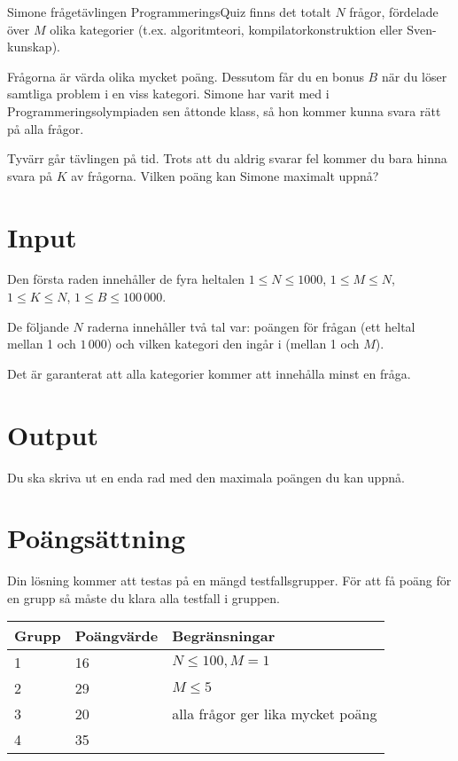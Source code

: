 Simone frågetävlingen ProgrammeringsQuiz finns det totalt $N$ frågor, fördelade över $M$ olika kategorier (t.ex. algoritmteori,
kompilatorkonstruktion eller Sven-kunskap).

Frågorna är värda olika mycket poäng. Dessutom får du en bonus $B$ när du löser samtliga problem i en viss kategori.
Simone har varit med i Programmeringsolympiaden sen åttonde klass, så hon kommer kunna svara rätt på alla frågor.

Tyvärr går tävlingen på tid. Trots att du aldrig svarar fel kommer du bara hinna svara på $K$ av frågorna.
Vilken poäng kan Simone maximalt uppnå?

\section*{Input}
Den första raden innehåller de fyra heltalen $1 \le N \le 1000$, $1 \le M \le N$, $1 \le K \le N$, $1 \le B \le 100\,000$.

De följande $N$ raderna innehåller två tal var: poängen för frågan (ett heltal mellan 1 och $1\,000$) och vilken kategori den ingår i (mellan 1 och $M$).

Det är garanterat att alla kategorier kommer att innehålla minst en fråga.

\section*{Output}
Du ska skriva ut en enda rad med den maximala poängen du kan uppnå.

\section*{Poängsättning}
Din lösning kommer att testas på en mängd testfallsgrupper. För att få poäng för en grupp så måste du klara alla testfall i gruppen.

\begin{tabular}{| l | l | l |}
  \hline
  Grupp & Poängvärde & Begränsningar\\ \hline
  1     & 16         & $N \le 100, M = 1$ \\ \hline
  2     & 29         & $M \le 5$ \\ \hline
  3     & 20         & alla frågor ger lika mycket poäng \\ \hline
  4     & 35         & \\ \hline
\end{tabular}
